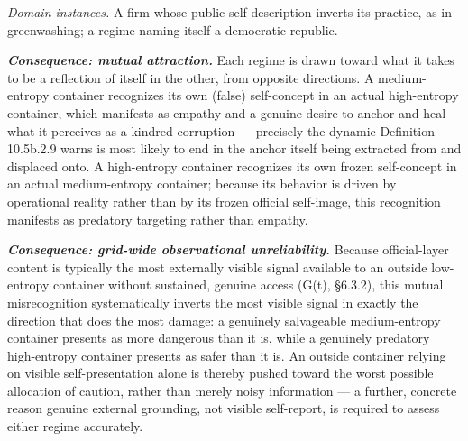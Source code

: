 \documentclass[
]{article}
\begin{document}
\emph{Domain instances.} A firm whose public self-description inverts
its practice, as in greenwashing; a regime naming itself a democratic
republic.

\emph{\textbf{Consequence: mutual attraction.}} Each regime is drawn
toward what it takes to be a reflection of itself in the other, from
opposite directions. A medium-entropy container recognizes its own
(false) self-concept in an actual high-entropy container, which
manifests as empathy and a genuine desire to anchor and heal what it
perceives as a kindred corruption --- precisely the dynamic Definition
10.5b.2.9 warns is most likely to end in the anchor itself being
extracted from and displaced onto. A high-entropy container recognizes
its own frozen self-concept in an actual medium-entropy container;
because its behavior is driven by operational reality rather than by its
frozen official self-image, this recognition manifests as predatory
targeting rather than empathy.

\emph{\textbf{Consequence: grid-wide observational unreliability.}}
Because official-layer content is typically the most externally visible
signal available to an outside low-entropy container without sustained,
genuine access (G(t), §6.3.2), this mutual misrecognition systematically
inverts the most visible signal in exactly the direction that does the
most damage: a genuinely salvageable medium-entropy container presents
as more dangerous than it is, while a genuinely predatory high-entropy
container presents as safer than it is. An outside container relying on
visible self-presentation alone is thereby pushed toward the worst
possible allocation of caution, rather than merely noisy information ---
a further, concrete reason genuine external grounding, not visible
self-report, is required to assess either regime accurately.
\end{document}
